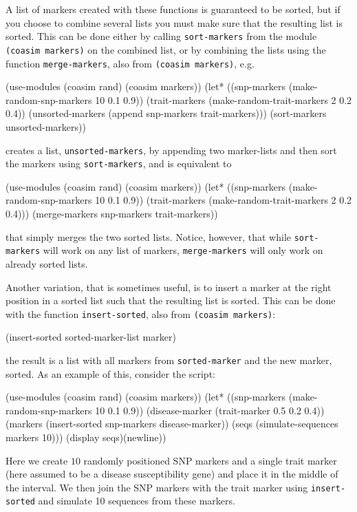 \documentclass{manual}
\begin{document}
A list of markers created with these functions is guaranteed to be
sorted, but if you choose to combine several lists you must make sure
that the resulting list is sorted.  This can be done either by calling
\texttt{sort-markers} from the module \texttt{(coasim markers)} on the
combined list, or by combining the lists using the function
\texttt{merge-markers}, also from \texttt{(coasim markers)}, e.g.\
\begin{code}
(use-modules (coasim rand) (coasim markers))
(let* ((snp-markers   (make-random-snp-markers   10 0.1 0.9))
       (trait-markers (make-random-trait-markers  2 0.2 0.4))
       (unsorted-markers (append snp-markers trait-markers)))
  (sort-markers unsorted-markers))
\end{code}
creates a list, \texttt{unsorted-markers}, by appending two marker-lists
and then sort the markers using \texttt{sort-markers}, and is
equivalent to 
\begin{code}
(use-modules (coasim rand) (coasim markers))
(let* ((snp-markers   (make-random-snp-markers   10 0.1 0.9))
       (trait-markers (make-random-trait-markers  2 0.2 0.4)))
  (merge-markers snp-markers trait-markers))
\end{code}
that simply merges the two sorted lists.  Notice, however, that while
\texttt{sort-markers} will work on any list of markers,
\texttt{merge-markers} will only work on already sorted lists.

Another variation, that is sometimes useful, is to insert a marker at
the right position in a sorted list such that the resulting list is
sorted.  This can be done with the function \texttt{insert-sorted},
also from \texttt{(coasim markers)}:
\begin{code}
(insert-sorted sorted-marker-list marker)
\end{code}
the result is a list with all markers from \texttt{sorted-marker} and
the new marker, sorted.  As an example of this, consider the script:
\begin{code}
(use-modules (coasim rand) (coasim markers))
(let* ((snp-markers    (make-random-snp-markers   10 0.1 0.9))
       (disease-marker (trait-marker 0.5 0.2 0.4))
       (markers (insert-sorted snp-markers disease-marker))
       (seqs (simulate-sequences markers 10)))
  (display seqs)(newline))
\end{code}
Here we create $10$ randomly positioned SNP markers and a single trait
marker (here assumed to be a disease susceptibility gene) and place it
in the middle of the interval.  We then join the SNP markers with the
trait marker using \texttt{insert-sorted} and simulate 10 sequences
from these markers.
\end{document}
